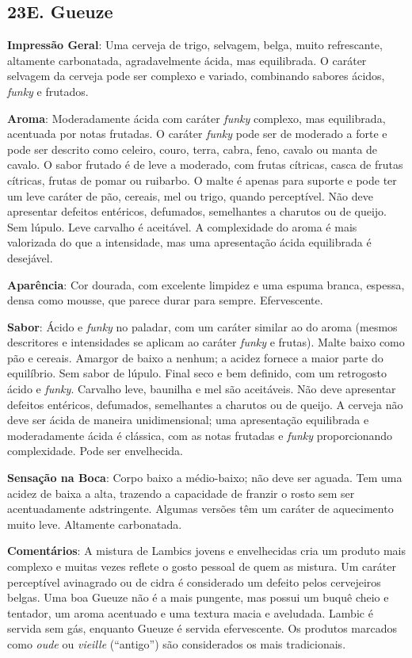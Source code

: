 \subsection*{23E. Gueuze}
\textbf{Impressão Geral}: Uma cerveja de trigo, selvagem, belga, muito refrescante, altamente carbonatada, agradavelmente ácida, mas equilibrada. O caráter selvagem da cerveja pode ser complexo e variado, combinando sabores ácidos, \textit{funky} e frutados.

\textbf{Aroma}: Moderadamente ácida com caráter \textit{funky} complexo, mas equilibrada, acentuada por notas frutadas. O caráter \textit{funky} pode ser de moderado a forte e pode ser descrito como celeiro, couro, terra, cabra, feno, cavalo ou manta de cavalo. O sabor frutado é de leve a moderado, com frutas cítricas, casca de frutas cítricas, frutas de pomar ou ruibarbo. O malte é apenas para suporte e pode ter um leve caráter de pão, cereais, mel ou trigo, quando perceptível. Não deve apresentar defeitos entéricos, defumados, semelhantes a charutos ou de queijo. Sem lúpulo. Leve carvalho é aceitável. A complexidade do aroma é mais valorizada do que a intensidade, mas uma apresentação ácida equilibrada é desejável.

\textbf{Aparência}: Cor dourada, com excelente limpidez e uma espuma branca, espessa, densa como mousse, que parece durar para sempre. Efervescente.

\textbf{Sabor}: Ácido e \textit{funky} no paladar, com um caráter similar ao do aroma (mesmos descritores e intensidades se aplicam ao caráter \textit{funky} e frutas). Malte baixo como pão e cereais. Amargor de baixo a nenhum; a acidez fornece a maior parte do equilíbrio. Sem sabor de lúpulo. Final seco e bem definido, com um retrogosto ácido e \textit{funky}. Carvalho leve, baunilha e mel são aceitáveis. Não deve apresentar defeitos entéricos, defumados, semelhantes a charutos ou de queijo. A cerveja não deve ser ácida de maneira unidimensional; uma apresentação equilibrada e moderadamente ácida é clássica, com as notas frutadas e \textit{funky} proporcionando complexidade. Pode ser envelhecida.

\textbf{Sensação na Boca}: Corpo baixo a médio-baixo; não deve ser aguada. Tem uma acidez de baixa a alta, trazendo a capacidade de franzir o rosto sem ser acentuadamente adstringente. Algumas versões têm um caráter de aquecimento muito leve. Altamente carbonatada.

\textbf{Comentários}: A mistura de Lambics jovens e envelhecidas cria um produto mais complexo e muitas vezes reflete o gosto pessoal de quem as mistura. Um caráter perceptível avinagrado ou de cidra é considerado um defeito pelos cervejeiros belgas. Uma boa Gueuze não é a mais pungente, mas possui um buquê cheio e tentador, um aroma acentuado e uma textura macia e aveludada. Lambic é servida sem gás, enquanto Gueuze é servida efervescente. Os produtos marcados como \textit{oude} ou \textit{vieille} (“antigo”) são considerados os mais tradicionais.

